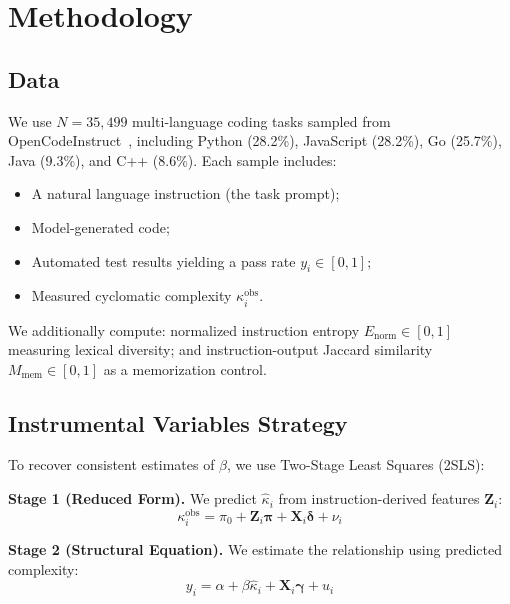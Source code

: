 \documentclass[conference]{IEEEtran}
\begin{document}
\section{Methodology}
\label{sec:methodology}

\subsection{Data}

We use $N = 35{,}499$ multi-language coding tasks sampled from OpenCodeInstruct~\cite{opencodeinst}, including Python (28.2\%), JavaScript (28.2\%), Go (25.7\%), Java (9.3\%), and C++ (8.6\%). Each sample includes:
\begin{itemize}
    \item A natural language instruction (the task prompt);
    \item Model-generated code;
    \item Automated test results yielding a pass rate $y_i \in [0, 1]$;
    \item Measured cyclomatic complexity $\kappa_i^{\text{obs}}$.
\end{itemize}

We additionally compute: normalized instruction entropy $E_{\text{norm}} \in [0,1]$ measuring lexical diversity; and instruction-output Jaccard similarity $M_{\text{mem}} \in [0,1]$ as a memorization control.

\subsection{Instrumental Variables Strategy}

To recover consistent estimates of $\beta$, we use Two-Stage Least Squares (2SLS):

\textbf{Stage 1 (Reduced Form).} We predict $\hat{\kappa}_i$ from instruction-derived features $\mathbf{Z}_i$:
\begin{equation}
    \kappa_i^{\text{obs}} = \pi_0 + \mathbf{Z}_i \boldsymbol{\pi} + \mathbf{X}_i \boldsymbol{\delta} + \nu_i
    \label{eq:stage1}
\end{equation}

\textbf{Stage 2 (Structural Equation).} We estimate the relationship using predicted complexity:
\begin{equation}
    y_i = \alpha + \beta \hat{\kappa}_i + \mathbf{X}_i \boldsymbol{\gamma} + u_i
    \label{eq:stage2}
\end{equation}
\end{document}
